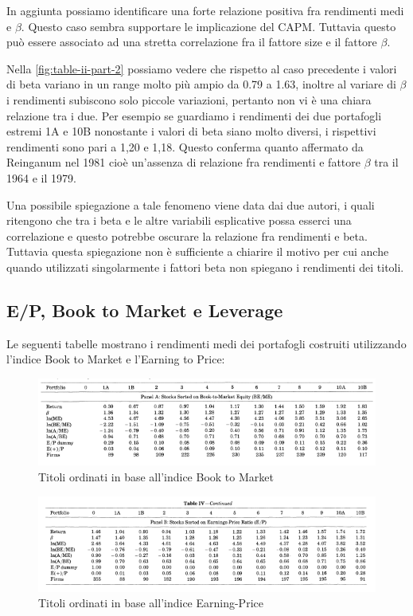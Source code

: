 In aggiunta possiamo identificare una forte relazione positiva fra rendimenti medi e $\beta$. Questo caso sembra supportare le implicazione del CAPM. Tuttavia questo può essere associato ad una stretta correlazione fra il fattore size e il fattore $\beta$.


Nella \ref{fig:table-ii-part-2} possiamo vedere che rispetto al caso precedente i valori di beta variano in un range molto più ampio da 0.79 a 1.63, inoltre al variare di $\beta$ i rendimenti subiscono solo piccole variazioni, pertanto non vi è una chiara relazione tra i due. Per esempio se guardiamo i rendimenti dei due portafogli estremi 1A e 10B nonostante i valori di beta siano molto diversi, i rispettivi rendimenti sono pari a 1,20 e 1,18. Questo conferma quanto affermato da Reinganum nel 1981 cioè un'assenza di relazione fra rendimenti e fattore $\beta$ tra il 1964 e il 1979. 

Una possibile spiegazione a tale fenomeno viene data dai due autori, i quali ritengono che tra i beta e le altre variabili esplicative possa esserci una correlazione e questo potrebbe oscurare la relazione fra rendimenti e beta. Tuttavia questa spiegazione non è sufficiente a chiarire il motivo per cui anche quando utilizzati singolarmente i fattori beta non spiegano i rendimenti dei titoli. 

\subsection{E/P, Book to Market e Leverage}

Le seguenti tabelle mostrano i rendimenti medi dei portafogli costruiti utilizzando l'indice Book to Market e l'Earning to Price:
\begin{figure} [h]
	\centering
	\includegraphics[width=1\linewidth]{"imgs/table IV part 1"}
	\caption{Titoli ordinati in base all'indice Book to Market}
	\label{fig:table-iv-part-1}
\end{figure}

\begin{figure} [h]
	\centering
\includegraphics[width=1\linewidth]{"imgs/table iv part 2"}
\caption{Titoli ordinati in base all'indice Earning-Price}
\label{fig:table-iv-part-2}
\end{figure}



